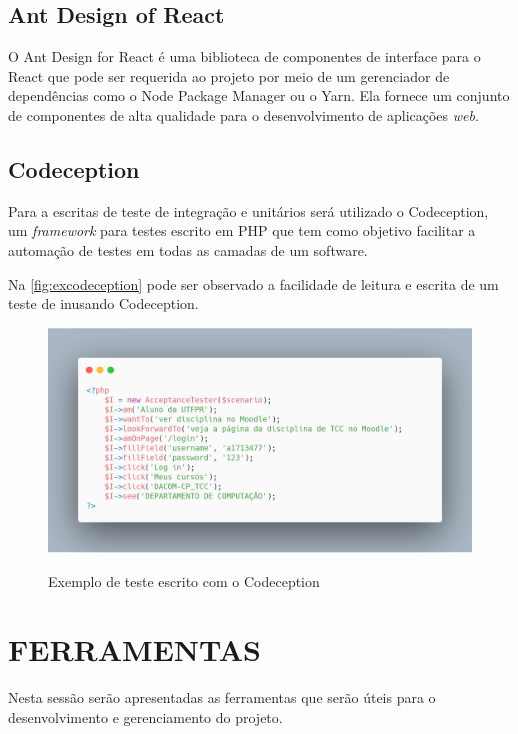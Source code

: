 \subsection{Ant Design of React}
\label{sub:ant}

O Ant Design for React é uma biblioteca de componentes de interface para o React que pode ser requerida ao projeto por meio de um gerenciador de dependências como o Node Package Manager ou o Yarn. Ela fornece um conjunto de componentes de alta qualidade para o desenvolvimento de aplicações \textit{web}.

\subsection{Codeception}
\label{sub:codeception}

Para a escritas de teste de integração e unitários será utilizado o Codeception, um \textit{framework} para testes escrito em PHP que tem como objetivo facilitar a automação de testes em todas as camadas de um software.

Na \autoref{fig:excodeception} pode ser observado a facilidade de leitura e escrita de um teste de inusando Codeception.

\begin{figure}[H]
    \centering
    \caption{Exemplo de teste escrito com o Codeception}
    \includegraphics[width=13cm]{dados/figuras/teste_codeception.png}
    \label{fig:excodeception}
\end{figure}

\section{FERRAMENTAS}
\label{sec:ferramentas}
Nesta sessão serão apresentadas as ferramentas que serão úteis para o desenvolvimento e gerenciamento do projeto.

